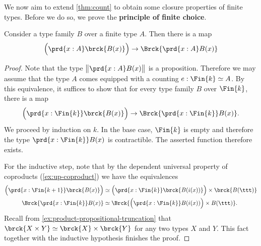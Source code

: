 We now aim to extend \cref{thm:count} to obtain some closure properties of finite types. Before we do so, we prove the \textbf{principle of finite choice}.

\begin{prp}\label{prp:finite-choice}
  Consider a type family $B$ over a finite type $A$. Then there is a  map
  \begin{equation*}
    \Big(\prd{x:A}\brck{B(x)}\Big)\to\Brck{\prd{x:A}B(x)}
  \end{equation*}
\end{prp}

\begin{proof}
  Note that the type $\big\|\prd{x:A}B(x)\big\|$ is a proposition. Therefore we may assume that the type $A$ comes equipped with a counting $e:\Fin{k}\simeq A$. By this equivalence, it suffices to show that for every type family $B$ over $\Fin{k}$, there is a map
  \begin{equation*}
    \Big(\prd{x:\Fin{k}}\brck{B(x)}\Big)\to\Brck{\prd{x:\Fin{k}}B(x)}.
  \end{equation*}
  We proceed by induction on $k$. In the base case, $\Fin{k}$ is empty and therefore the type $\prd{x:\Fin{k}}B(x)$ is contractible. The asserted function therefore exists.

  For the inductive step, note that by the dependent universal property of coproducts (\cref{ex:up-coproduct}) we have the equivalences
  \begin{align*}
    \Big(\prd{x:\Fin{k+1}}\brck{B(x)}\Big) & \simeq \Big(\prd{x:\Fin{k}}\brck{B(i(x))}\Big)\times \brck{B(\ttt)} \\
    \Brck{\prd{x:\Fin{k}}B(x)} & \simeq \Brck{\Big(\prd{x:\Fin{k}}B(i(x))\Big)\times B(\ttt)}.
  \end{align*}
  Recall from \cref{ex:product-propositional-truncation} that $\brck{X\times Y}\simeq \brck{X}\times\brck{Y}$ for any two types $X$ and $Y$. This fact together with the inductive hypothesis finishes the proof.
\end{proof}

